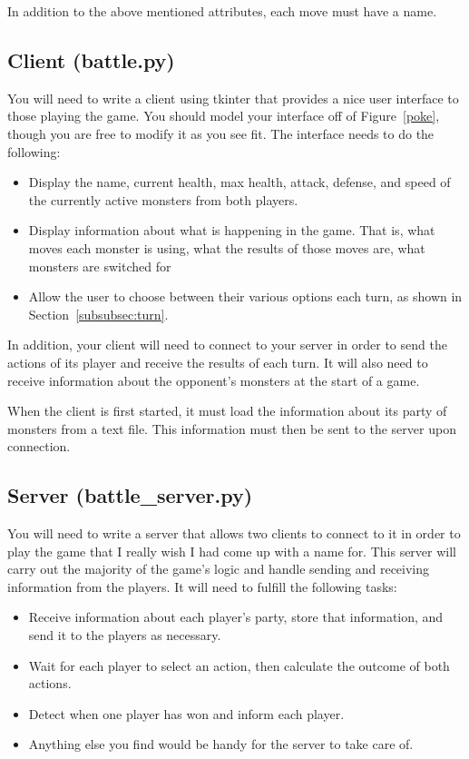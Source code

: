 \documentclass[11pt]{cselabheader}
\begin{document}
In addition to the above mentioned attributes, each move must have a name.

\subsection{Client (battle.py)}
You will need to write a client using tkinter that provides a nice user interface
to those playing the game. You should model your interface off of
Figure~\ref{poke}, though you are free to modify it as you see fit. The interface
needs to do the following:
\begin{itemize}
\item Display the name, current health, max health, attack, defense, and speed of the
  currently active monsters from both players.
\item Display information about what is happening in the game. That is, what moves each
  monster is using, what the results of those moves are, what monsters are switched for
\item Allow the user to choose between their various options each turn, as shown in
  Section~\ref{subsubsec:turn}.
\end{itemize}

In addition, your client will need to connect to your server in order to send the
actions of its player and receive the results of each turn. It will also need to
receive information about the opponent's monsters at the start of a game.

When the client is first started, it must load the information about its party
of monsters from a text file. This information must then be sent to the server upon
connection.

\subsection{Server (battle\_server.py)}
You will need to write a server that allows two clients to connect to it in order
to play the game that I really wish I had come up with a name for. This server will
carry out the majority of the game's logic and handle sending and receiving information
from the players. It will need to fulfill the following tasks:

\begin{itemize}
\item Receive information about each player's party, store that information, and
  send it to the players as necessary.
\item Wait for each player to select an action, then calculate the outcome of
  both actions.
\item Detect when one player has won and inform each player.
\item Anything else you find would be handy for the server to take care of.
\end{itemize}
\end{document}
